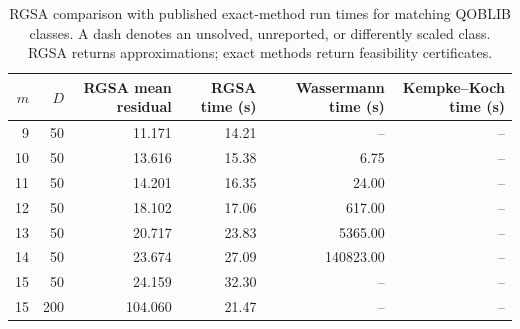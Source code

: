 \begin{table}[htbp]
\centering
\caption{RGSA comparison with published exact-method run times for matching QOBLIB classes.  A dash denotes an unsolved, unreported, or differently scaled class.  RGSA returns approximations; exact methods return feasibility certificates.}
\label{tab:rgsa-literature}
\begin{tabular}{rrrrrr}
\toprule
$m$ & $D$ & RGSA mean residual & RGSA time (s) & Wassermann time (s) & Kempke--Koch time (s) \\
\midrule
9 & 50 & 11.171 & 14.21 & -- & -- \\
10 & 50 & 13.616 & 15.38 & 6.75 & -- \\
11 & 50 & 14.201 & 16.35 & 24.00 & -- \\
12 & 50 & 18.102 & 17.06 & 617.00 & -- \\
13 & 50 & 20.717 & 23.83 & 5365.00 & -- \\
14 & 50 & 23.674 & 27.09 & 140823.00 & -- \\
15 & 50 & 24.159 & 32.30 & -- & -- \\
15 & 200 & 104.060 & 21.47 & -- & -- \\
\bottomrule
\end{tabular}
\end{table}
